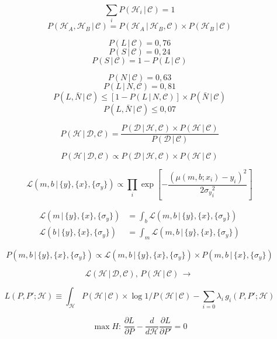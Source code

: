 \documentclass[12pt]{article}
\begin{document}
$$\sum_i P(\mathcal{H}_i\,|\,\mathcal{C})=1$$
$$P(\mathcal{H}_A,\mathcal{H}_B\,|\,\mathcal{C})=P(\mathcal{H}_A\,|\,\mathcal{H}_B,\mathcal{C})\times P(\mathcal{H}_B\,|\,\mathcal{C})$$

$$P(L\,|\,\mathcal{C})=0,76$$
$$P(S\,|\,\mathcal{C})=0,24$$
$$P(S\,|\,\mathcal{C})=1-P(L\,|\,\mathcal{C})$$

$$P(N\,|\,\mathcal{C})=0,63$$
$$P(L\,|\,N,\mathcal{C})=0,81$$
$$P(L,\bar{N}\,|\,\mathcal{C})\leq \left[1-P(L\,|\,N,\mathcal{C})\right]\times P(\bar{N}\,|\,\mathcal{C})$$
$$P(L,\bar{N}\,|\,\mathcal{C})\leq 0,07$$

\newpage

$$P(\mathcal{H}\,|\,\mathcal{D},\mathcal{C})=\frac{P(\mathcal{D}\,|\,\mathcal{H},\mathcal{C})\times P(\mathcal{H}\,|\,\mathcal{C})}{P(\mathcal{D\,|\,\mathcal{C}})}$$

$$P(\mathcal{H}\,|\,\mathcal{D},\mathcal{C})\propto P(\mathcal{D}\,|\,\mathcal{H},\mathcal{C})\times P(\mathcal{H}\,|\,\mathcal{C})$$

\newpage

$$\mathcal{L}(m,b\,|\,\{y\},\{x\},\{\sigma_y\})\propto\prod_i\exp{\left[-\frac{(\mu(m,b;x_i)-y_i)^2}{2{\sigma_y}_i^2}\right]}$$

\begin{align*}\mathcal{L}(m\,|\,\{y\},\{x\},\{\sigma_y\}) &= \int_b \mathcal{L}(m,b\,|\,\{y\},\{x\},\{\sigma_y\}) \\\mathcal{L}(b\,|\,\{y\},\{x\},\{\sigma_y\}) &= \int_m \mathcal{L}(m,b\,|\,\{y\},\{x\},\{\sigma_y\})\end{align*}

$$P(m,b\,|\,\{y\},\{x\},\{\sigma_y\})\propto \mathcal{L}(m,b\,|\,\{y\},\{x\},\{\sigma_y\})\times P(m,b\,|\,\{x\},\{\sigma_y\})$$

\newpage

$$\mathcal{L}(\mathcal{H}\,|\,\mathcal{D},\mathcal{C}),\,P(\mathcal{H}\,|\,\mathcal{C})\,\longrightarrow\,$$

$$L(P,P';\mathcal{H})\equiv\int_\mathcal{H}P(\mathcal{H}\,|\,\mathcal{C})\times\log{1/P(\mathcal{H}\,|\,\mathcal{C})}-\sum_{i=0}\lambda_i\,g_i(P,P';\mathcal{H})$$

$$\max{H}:\,\frac{\partial L}{\partial P}-\frac{d}{d\mathcal{H}}\frac{\partial L}{\partial P'}=0$$
\end{document}
